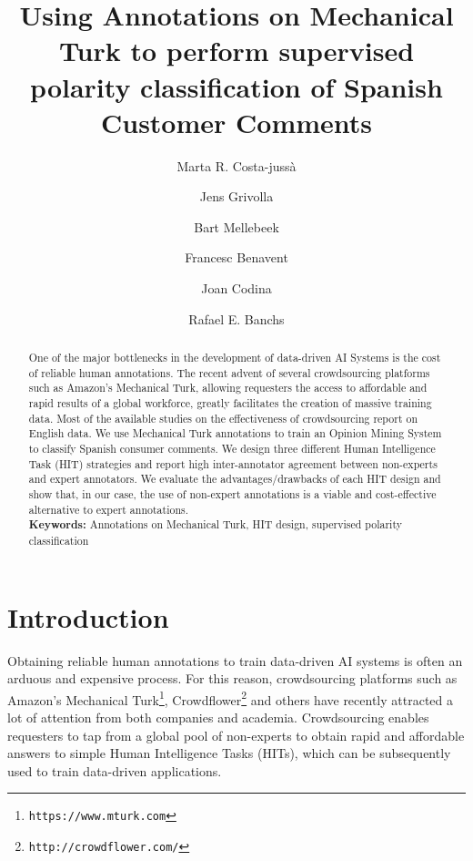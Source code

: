 \documentclass[11pt]{elsarticle}
\begin{document}
\title{Using Annotations on Mechanical Turk to perform supervised polarity classification of Spanish Customer Comments}

\author[i2r]{Marta R. Costa-juss\`a}
\author[fbm]{Jens Grivolla}
\author[uva]{Bart Mellebeek}
\author{Francesc Benavent}
\author[upf]{Joan Codina}
\author[i2r]{Rafael E. Banchs }
\address[i2r]{Institute for Infocomm Research, Singapore}
\address[fbm]{Barcelona Media Innovation Centre, Spain}
\address[upf]{Universitat Pompeu Fabra, Spain}
\address[uva]{University of Amsterdam, The Netherlands}


\begin{abstract}
 One of the major bottlenecks in the development of data-driven AI Systems is the cost of reliable human annotations. The recent advent of several crowdsourcing platforms such as Amazon's Mechanical Turk, allowing requesters the access to affordable and rapid results of a global workforce, greatly facilitates the creation of massive training data. Most of the available studies on the effectiveness of crowdsourcing report on English data. We use Mechanical Turk annotations to train an Opinion Mining System to classify Spanish consumer comments. We design three different Human Intelligence Task (HIT) strategies and report high inter-annotator agreement between non-experts and expert annotators. We evaluate the advantages/drawbacks of each HIT design and show that, in our case, the use of non-expert annotations is a viable and cost-effective alternative to expert annotations. \\ \textbf{Keywords:} Annotations on Mechanical Turk, HIT design, supervised polarity classification
\end{abstract}

\maketitle

\section{Introduction}
\label{sec:intro}

Obtaining reliable human annotations to train data-driven AI systems is often an arduous and expensive process. For this reason, crowdsourcing platforms such as Amazon's Mechanical Turk\footnote{\texttt{https://www.mturk.com}}, Crowdflower\footnote{\texttt{http://crowdflower.com/}} and others have recently attracted a lot of attention from both companies and academia. Crowdsourcing enables requesters to tap from a global pool of non-experts to obtain rapid and affordable answers to simple Human Intelligence Tasks (HITs), which can be subsequently used to train data-driven applications. 
\end{document}
